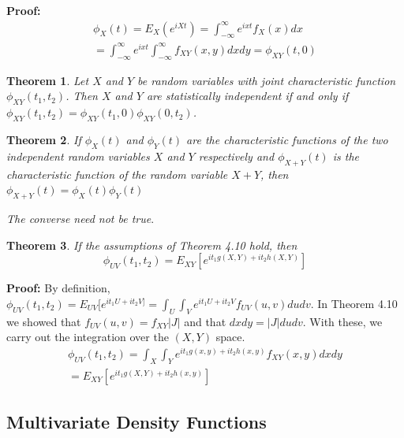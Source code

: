 \documentclass{article}
\newtheorem{theorem}{Theorem}[section]
\begin{document}
\textbf{Proof:}
\begin{equation*}
\begin{split}
    \phi_X(t)=E_X(e^{iXt})= \int_{-\infty}^{\infty} e^{ixt}f_X(x) dx \\
    = \int_{-\infty}^{\infty} e^{ixt} \int_{-\infty}^{\infty} f_{XY}(x,y)dxdy=\phi_{XY}(t,0)
\end{split}
\end{equation*}

\begin{theorem}
    Let \(X\) and \(Y\) be random variables with joint characteristic function \(\phi_{XY}(t_1,t_2)\). Then \(X\) and \(Y\) are statistically independent if and only if \(\phi_{XY}(t_1,t_2)=\phi_{XY}(t_1,0) \phi_{XY}(0,t_2)\).
\end{theorem}

\begin{theorem}
    If \(\phi_X(t)\) and \(\phi_Y(t)\) are the characteristic functions of the two independent random variables \(X\) and \(Y\) respectively and \(\phi_{X+Y}(t)\) is the characteristic function of the random variable \(X+Y\), then \(\phi_{X+Y}(t)=\phi_X(t)\phi_Y(t)\)
\end{theorem}

\textit{The converse need not be true}.

\begin{theorem}
    If the assumptions of Theorem 4.10 hold, then
    \begin{equation*}
        \phi_{UV}(t_1,t_2)=E_{XY}[e^{it_1g(X,Y)+it_2h(X,Y)}]
    \end{equation*}
\end{theorem}

\textbf{Proof:} By definition, \(\phi_{UV}(t_1,t_2)=E_{UV}[e^{it_1U+it_2V]} = \int_U \int_V e^{it_1U+it_2V} f_{UV}(u,v) du dv\). In Theorem 4.10 we showed that \(f_{UV}(u,v)=f_{XY}|J|\) and that \(dxdy=|J|dudv\). With these, we carry out the integration over the \((X,Y)\) space.
\begin{equation*}
    \begin{split}
        \phi_{UV}(t_1,t_2)= \int_X \int_Y e^{it_1g(x,y)+it_2h(x,y)} f_{XY}(x,y) dxdy \\
        = E_{XY}[e^{it_1g(X,Y)+it_2h(x,y)}]
    \end{split}
\end{equation*}

\subsection{Multivariate Density Functions}
\end{document}
